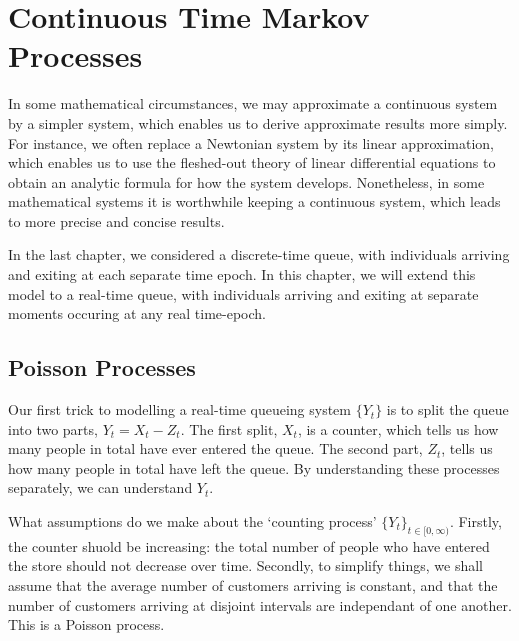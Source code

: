 \chapter{Continuous Time Markov Processes}

In some mathematical circumstances, we may approximate a continuous system by a simpler system, which enables us to derive approximate results more simply. For instance, we often replace a Newtonian system by its linear approximation, which enables us to use the fleshed-out theory of linear differential equations to obtain an analytic formula for how the system develops. Nonetheless, in some mathematical systems it is worthwhile keeping a continuous system, which leads to more precise and concise results.

In the last chapter, we considered a discrete-time queue, with individuals arriving and exiting at each separate time epoch. In this chapter, we will extend this model to a real-time queue, with individuals arriving and exiting at separate moments occuring at any real time-epoch.

\section{Poisson Processes}

Our first trick to modelling a real-time queueing system $\{ Y_t \}$ is to split the queue into two parts, $Y_t = X_t - Z_t$. The first split, $X_t$, is a counter, which tells us how many people in total have ever entered the queue. The second part, $Z_t$, tells us how many people in total have left the queue. By understanding these processes separately, we can understand $Y_t$.

What assumptions do we make about the `counting process' $\{ Y_t \}_{t \in [0,\infty)}$. Firstly, the counter shuold be increasing: the total number of people who have entered the store should not decrease over time. Secondly, to simplify things, we shall assume that the average number of customers arriving is constant, and that the number of customers arriving at disjoint intervals are independant of one another. This is a Poisson process.


